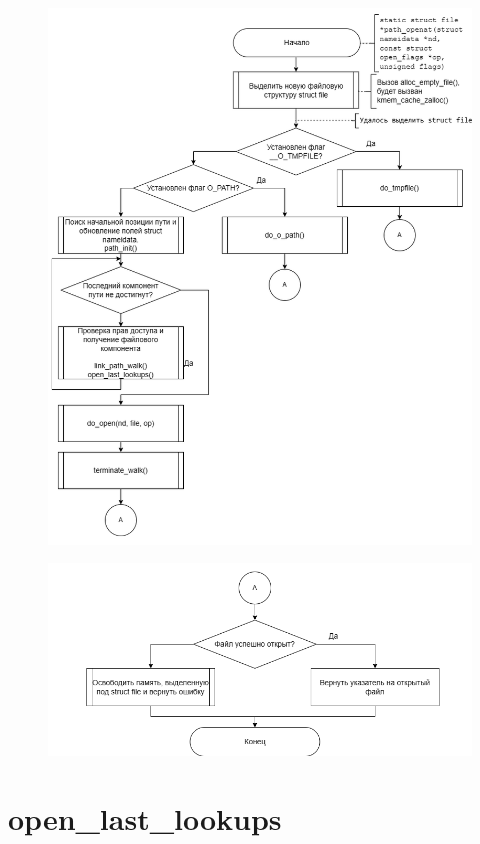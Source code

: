 \documentclass[12pt]{report}
\begin{document}
	\begin{figure}[H]
		\centering
		\includegraphics[scale=0.8]{path_openat1}
	\end{figure}
	
		\begin{figure}[H]
		\centering
		\includegraphics[scale=0.8]{path_openat2}
	\end{figure}
	
	\section{open\_last\_lookups}
	
\end{document}
